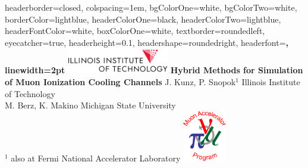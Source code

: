 \documentclass[portrait,a0paper,fontscale=0.285]{baposter} %
\begin{document}
\begin{poster}
{
headerborder=closed, %
colspacing=1em, %
bgColorOne=white, %
bgColorTwo=white, %
borderColor=lightblue, %
headerColorOne=black, %
headerColorTwo=lightblue, %
headerFontColor=white, %
boxColorOne=white, %
textborder=roundedleft, %
eyecatcher=true, %
headerheight=0.1\textheight, %
headershape=roundedright, %
headerfont=\Large\bf\textsc, %
linewidth=2pt %
}
%
{\includegraphics[height=3em]{IITlogo.png}} %
{\bf\huge{\hspace{-1.5in}Hybrid Methods for Simulation \\ \hspace{-1.5in}of Muon Ionization Cooling Channels}\vspace{0.1em}} %
{{ \large{\hspace{-1.5in}J. Kunz, P. Snopok$^1$ \hspace{12pt} Illinois Institute of Technology \\\hspace{-1.5in}M. Berz, K. Makino \hspace{12pt}Michigan State University \\\hspace{-1.5in}$^1$ also at Fermi National Accelerator Laboratory \vspace{-0.4em}}}}
{\includegraphics[height=6em]{MAPlogo.png}} %


\end{poster}
\end{document}
